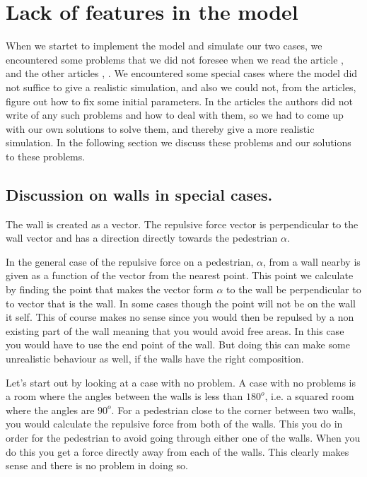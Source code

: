 \section{Lack of features in the model}
\label{sec:lack}
When we startet to implement the model and simulate our two cases, we encountered some
problems that we did not foresee when we read the article \cite{self-org}, and the other
articles \cite{helbing00}, \cite{social-force}.
We encountered some special cases where the model did not suffice to give a realistic
simulation, and also we could not, from the articles, figure out how to fix some initial parameters.
In the articles the authors did not write of any such problems and how to deal with them,
so we had to come up with our own solutions to solve them, and thereby give a more realistic
simulation.
In the following section we discuss these problems and our solutions to these problems.

\subsection{Discussion on walls in special cases.}\label{wallEndpoints}
The wall is created as a vector. The repulsive force vector is perpendicular to the wall 
vector and has a direction directly towards the pedestrian $\alpha$.

In the general case of the repulsive force on a pedestrian, $\alpha$, from a wall 
nearby is given as a function of the vector from the nearest point. This point we 
calculate by finding the point that makes the vector form $\alpha$ to the wall be 
perpendicular to to vector that is the wall. In some cases though the point will not 
be on the wall it self. This of course makes no sense since you would then be 
repulsed by a non existing part of the wall meaning that you would avoid free 
areas. In this case you would have to use the end point of the wall. But doing this 
can make some unrealistic behaviour as well, if the walls have the right composition. 

Let's start out by looking at a case with no problem. A case with no problems is a 
room where the angles between the walls is less than $180^o$, i.e. a squared room 
where the angles are $90^o$. For a pedestrian close to the corner between two walls, you 
would calculate the repulsive force from both of the walls. This you do in order 
for the pedestrian to avoid going through either one of the walls. When you do 
this you get a force directly away from each of the walls. This clearly makes 
sense and there is no problem in doing so.

